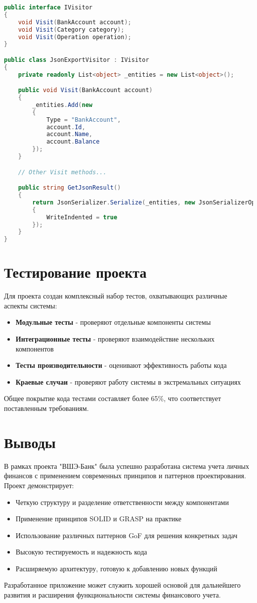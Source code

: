 \documentclass[12pt,a4paper]{article}
\begin{document}
\begin{lstlisting}[language=csharp]
public interface IVisitor
{
    void Visit(BankAccount account);
    void Visit(Category category);
    void Visit(Operation operation);
}

public class JsonExportVisitor : IVisitor
{
    private readonly List<object> _entities = new List<object>();

    public void Visit(BankAccount account)
    {
        _entities.Add(new 
        {
            Type = "BankAccount",
            account.Id,
            account.Name,
            account.Balance
        });
    }

    // Other Visit methods...

    public string GetJsonResult()
    {
        return JsonSerializer.Serialize(_entities, new JsonSerializerOptions
        {
            WriteIndented = true
        });
    }
}
\end{lstlisting}

\section{Тестирование проекта}

Для проекта создан комплексный набор тестов, охватывающих различные аспекты системы:

\begin{itemize}
    \item \textbf{Модульные тесты} - проверяют отдельные компоненты системы
    \item \textbf{Интеграционные тесты} - проверяют взаимодействие нескольких компонентов
    \item \textbf{Тесты производительности} - оценивают эффективность работы кода
    \item \textbf{Краевые случаи} - проверяют работу системы в экстремальных ситуациях
\end{itemize}

Общее покрытие кода тестами составляет более 65\%, что соответствует поставленным требованиям.

\section{Выводы}

В рамках проекта "ВШЭ-Банк" была успешно разработана система учета личных финансов с применением современных принципов и паттернов проектирования. Проект демонстрирует:

\begin{itemize}
    \item Четкую структуру и разделение ответственности между компонентами
    \item Применение принципов SOLID и GRASP на практике
    \item Использование различных паттернов GoF для решения конкретных задач
    \item Высокую тестируемость и надежность кода
    \item Расширяемую архитектуру, готовую к добавлению новых функций
\end{itemize}

Разработанное приложение может служить хорошей основой для дальнейшего развития и расширения функциональности системы финансового учета.
\end{document}
